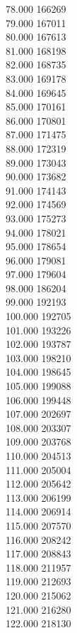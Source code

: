 { 78.000	166269 \\
 79.000	167011 \\
 80.000	167613 \\
 81.000	168198 \\
 82.000	168735 \\
 83.000	169178 \\
 84.000	169645 \\
 85.000	170161 \\
 86.000	170801 \\
 87.000	171475 \\
 88.000	172319 \\
 89.000	173043 \\
 90.000	173682 \\
 91.000	174143 \\
 92.000	174569 \\
 93.000	175273 \\
 94.000	178021 \\
 95.000	178654 \\
 96.000	179081 \\
 97.000	179604 \\
 98.000	186204 \\
 99.000	192193 \\
 100.000	192705 \\
 101.000	193226 \\
 102.000	193787 \\
 103.000	198210 \\
 104.000	198645 \\
 105.000	199088 \\
 106.000	199448 \\
 107.000	202697 \\
 108.000	203307 \\
 109.000	203768 \\
 110.000	204513 \\
 111.000	205004 \\
 112.000	205642 \\
 113.000	206199 \\
 114.000	206914 \\
 115.000	207570 \\
 116.000	208242 \\
 117.000	208843 \\
 118.000	211957 \\
 119.000	212693 \\
 120.000	215062 \\
 121.000	216280 \\
 122.000	218130 \\
}
